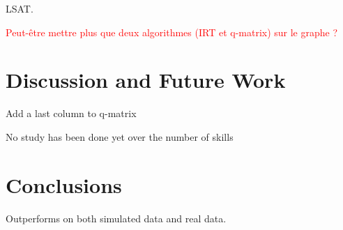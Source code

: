 \documentclass{sig-alternate}
\newcommand\alert[1]{\textcolor{red}{#1}}
\begin{document}
LSAT.

\alert{Peut-être mettre plus que deux algorithmes (IRT et q-matrix) sur le graphe ?}

\section{Discussion and Future Work}

Add a last column to q-matrix

No study has been done yet over the number of skills

\section{Conclusions}

Outperforms on both simulated data and real data.

%


%
%

\end{document}
